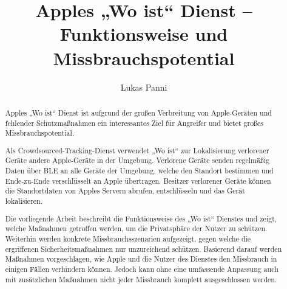 \documentclass[runningheads]{llncs}
\begin{document}
\title{Apples „Wo ist“ Dienst – Funktionsweise und Missbrauchspotential}


\author{Lukas Panni}


\maketitle              %

\begin{abstract}
Apples „Wo ist“ Dienst ist aufgrund der großen Verbreitung von Apple-Geräten und fehlender Schutzmaßnahmen ein interessantes Ziel für Angreifer und bietet großes Missbrauchspotential.

Als Crowdsourced-Tracking-Dienst verwendet „Wo ist“ zur Lokalisierung verlorener Geräte andere Apple-Geräte in der Umgebung.
Verlorene Geräte senden regelmäßig Daten über \ac{BLE} an alle Geräte der Umgebung, welche den Standort bestimmen und Ende-zu-Ende verschlüsselt an Apple übertragen.
Besitzer verlorener Geräte können die Standortdaten von Apples Servern abrufen, entschlüsseln und das Gerät lokalisieren.

Die vorliegende Arbeit beschreibt die Funktionsweise des „Wo ist“ Dienstes und zeigt, welche Maßnahmen getroffen werden, um die Privatsphäre der Nutzer zu schützen.
Weiterhin werden konkrete Missbrauchsszenarien aufgezeigt, gegen welche die ergriffenen Sicherheitsmaßnahmen nur unzureichend schützen.
Basierend darauf werden Maßnahmen vorgeschlagen, wie Apple und die Nutzer des Dienstes den Missbrauch in einigen Fällen verhindern können.
Jedoch kann ohne eine umfassende Anpassung auch mit zusätzlichen Maßnahmen nicht jeder Missbrauch komplett ausgeschlossen werden.
\end{abstract}




\newpage









\end{document}
